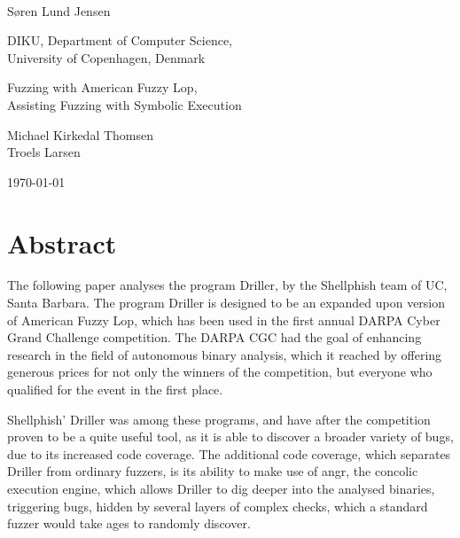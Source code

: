 \documentclass[a4paper]{article}
\begin{document}
\newpage


\maketitle

\newpage
\ \vspace{3.4cm}
\begin{description}[labelwidth=9em,leftmargin =\dimexpr\labelwidth+\labelsep\relax, font=\normalfont\space]
	\item[Author:]			Søren Lund Jensen
	\item[Affiliation:]		DIKU, Department of Computer Science,\\
							University of Copenhagen, Denmark
	\item[Title:]			Fuzzing with American Fuzzy Lop, \\
							Assisting Fuzzing with Symbolic Execution
	\item[Academic Advisor:]	Michael Kirkedal Thomsen \\
							Troels Larsen
	\item[Submitted:] 		\today
\end{description}
\newpage

\tableofcontents

\newpage
\section{Abstract}
\label{sec:Abstract}
The following paper analyses the program Driller, by the Shellphish team of UC, Santa Barbara. The program Driller is designed to be an expanded upon version of American Fuzzy Lop\cite{AFL}, which has been used in the first annual DARPA Cyber Grand Challenge\cite{DARPA} competition. The DARPA CGC had the goal of enhancing research in the field of autonomous binary analysis, which it reached by offering generous prices for not only the winners of the competition, but everyone who qualified for the event in the first place.

Shellphish' Driller was among these programs, and have after the competition proven to be a quite useful tool, as it is able to discover a broader variety of bugs, due to its increased code coverage. The additional code coverage, which separates Driller from ordinary fuzzers, is its ability to make use of angr, the concolic execution engine, which allows Driller to dig deeper into the analysed binaries, triggering bugs, hidden by several layers of complex checks, which a standard fuzzer would take ages to randomly discover.
\end{document}
